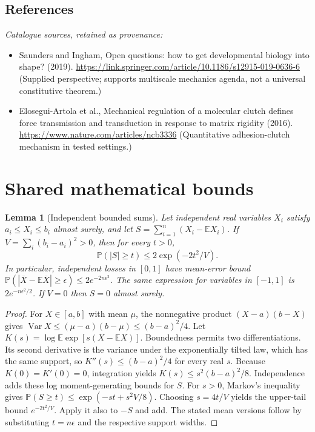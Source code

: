 \documentclass[11pt]{article}
\newcommand{\E}{\mathbb E}
\newcommand{\Prob}{\mathbb P}
\DeclareMathOperator{\Var}{Var}
\providecommand{\E}{\mathbb E}
\providecommand{\Prob}{\mathbb P}
\providecommand{\Var}{\operatorname{Var}}
\newtheorem{sharedlemma}{Lemma}[section]
\begin{document}
\subsection{References}
\noindent\emph{Catalogue sources, retained as provenance:}
\begin{itemize}
\item Saunders and Ingham, Open questions: how to get developmental biology into shape? (2019). \url{https://link.springer.com/article/10.1186/s12915-019-0636-6} (Supplied perspective; supports multiscale mechanics agenda, not a universal constitutive theorem.)
\item Elosegui-Artola et al., Mechanical regulation of a molecular clutch defines force transmission and transduction in response to matrix rigidity (2016). \url{https://www.nature.com/articles/ncb3336} (Quantitative adhesion-clutch mechanism in tested settings.)
\end{itemize}
\clearpage


\appendix
\section{Shared mathematical bounds}\label{app:bounds}
\begin{sharedlemma}[Independent bounded sums]\label{lem:bounded}
Let independent real variables $X_i$ satisfy $a_i\leq X_i\leq b_i$ almost surely,
and let $S=\sum_{i=1}^n(X_i-\E X_i)$. If
$V=\sum_i(b_i-a_i)^2>0$, then for every $t>0$,
\[
 \Prob(|S|\geq t)\leq 2\exp(-2t^2/V).
\]
In particular, independent losses in $[0,1]$ have mean-error bound
$\Prob(|\overline X-\E\overline X|\geq\epsilon)
\leq2e^{-2n\epsilon^2}$. The same expression for variables in $[-1,1]$
is $2e^{-n\epsilon^2/2}$. If $V=0$ then $S=0$ almost surely.
\end{sharedlemma}
\begin{proof}
For $X\in[a,b]$ with mean $\mu$, the nonnegative product
$(X-a)(b-X)$ gives
$\Var X\leq(\mu-a)(b-\mu)\leq(b-a)^2/4$.
Let $K(s)=\log\E\exp[s(X-\E X)]$.
Boundedness permits two differentiations. Its second derivative is the variance
under the exponentially tilted law, which has the same support, so
$K''(s)\leq(b-a)^2/4$ for every real $s$.
Because $K(0)=K'(0)=0$, integration yields
$K(s)\leq s^2(b-a)^2/8$.
Independence adds these log moment-generating bounds for $S$.
For $s>0$, Markov's inequality gives
$\Prob(S\geq t)\leq\exp(-st+s^2V/8)$.
Choosing $s=4t/V$ yields the upper-tail bound $e^{-2t^2/V}$.
Apply it also to $-S$ and add. The stated mean versions follow by substituting
$t=n\epsilon$ and the respective support widths.
\end{proof}
\end{document}
